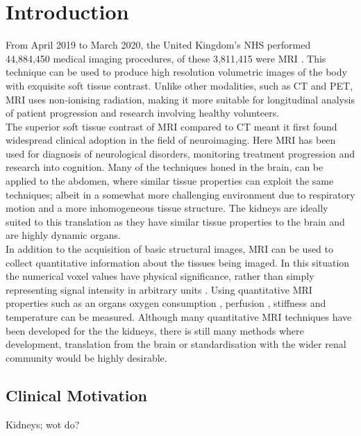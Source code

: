 \chapter*{Introduction}
From April 2019 to March 2020, the United Kingdom's \ac{NHS} performed 44,884,450 medical imaging procedures, of these 3,811,415 were \ac{MRI} \cite{noauthor_diagnostic_2020}. This technique can be used to produce high resolution volumetric images of the body with exquisite soft tissue contrast. Unlike other modalities, such as \ac{CT} and \ac{PET}, \ac{MRI} uses non-ionising radiation, making it more suitable for longitudinal analysis of patient progression and research involving healthy volunteers.\\

The superior soft tissue contrast of \ac{MRI} compared to \ac{CT} meant it first found widespread clinical adoption in the field of neuroimaging. Here \ac{MRI} has been used for diagnosis of neurological disorders, monitoring treatment progression and research into cognition. Many of the techniques honed in the brain, can be applied to the abdomen, where similar tissue properties can exploit the same techniques; albeit in a somewhat more challenging environment due to respiratory motion and a more inhomogeneous tissue structure. The kidneys are ideally suited to this translation as they have similar tissue properties to the brain and are highly dynamic organs.\\

In addition to the acquisition of basic structural images, \ac{MRI} can be used to collect quantitative information about the tissues being imaged. In this situation the numerical voxel values have physical significance, rather than simply representing signal intensity in arbitrary units \cite{tofts_quantitative_2003}. Using quantitative \ac{MRI} properties such as an organs oxygen consumption \cite{zhang_quantitative_2015}, perfusion \cite{karger_quantitation_2000}, stiffness \cite{mariappan_magnetic_2010} and temperature \cite{yuan_towards_2012} can be measured. Although many quantitative \ac{MRI} techniques have been developed for the the kidneys, there is still many methods where development, translation from the brain or standardisation with the wider renal community would be highly desirable.

\section*{Clinical Motivation}
Kidneys; wot do? 


